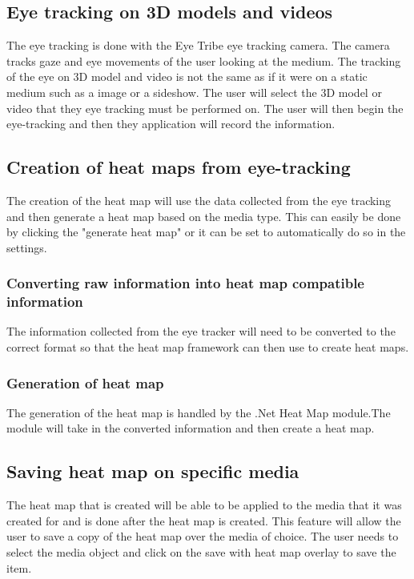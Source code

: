 \iffalse
\subsection{Eye tracking on 3D models and videos}
The eye tracking is done with the Eye Tribe eye tracking camera. The camera tracks gaze and eye movements of the user looking at the medium. The tracking of the eye on 3D model and video is not the same as if it were on a static medium such as a image or a sideshow. The user will select the 3D model or video that they eye tracking must be performed on. The user will then begin the eye-tracking and then they application will record the information.

\subsection{Creation of heat maps from eye-tracking}
The creation of the heat map will use the data collected from the eye tracking and then generate a heat map based on the media type. This can easily be done by clicking the "generate heat map" or it can be set to automatically do so in the settings.

\subsubsection{Converting raw information into heat map compatible information}
The information collected from the eye tracker will need to be converted to the correct format so that the heat map framework can then use to create heat maps.

\subsubsection{Generation of heat map}
The generation of the heat map is handled by the .Net Heat Map module.The module will take in the converted information and then create a heat map.

\subsection{Saving heat map on specific media}
The heat map that is created will be able to be applied to the media that it was created for and is done after the heat map is created. This feature will allow the user to save a copy of the heat map over the media of choice. The user needs to select the media object and click on the save with heat map overlay to save the item.


